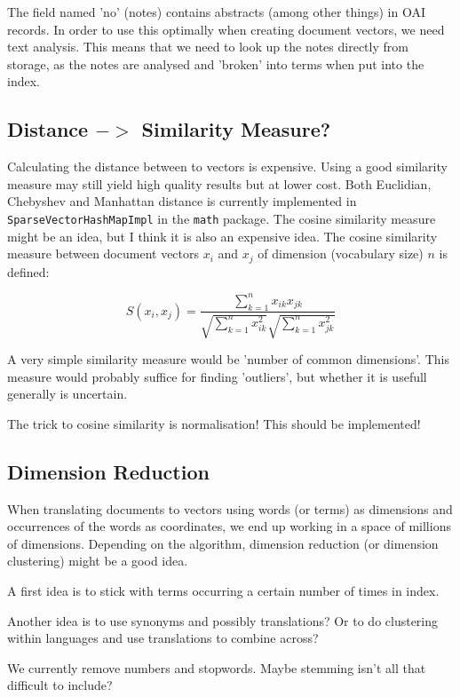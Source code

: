 \documentclass[a4paper,12pt]{article}
\begin{document}
The field named 'no' (notes) contains abstracts (among other things)
in OAI records. In order to use this optimally when creating document
vectors, we need text analysis. This means that we need to look up
the notes directly from storage, as the notes are analysed and
'broken' into terms when put into the index.

\subsection{Distance $->$ Similarity Measure?}

Calculating the distance between to vectors is expensive. Using a good
similarity measure may still yield high quality results but at lower
cost. Both Euclidian, Chebyshev and Manhattan distance is currently
implemented in \texttt{SparseVectorHashMapImpl} in the \texttt{math}
package. The cosine similarity measure might be an idea, but I think
it is also an expensive idea. The cosine similarity measure between
document vectors $x_i$ and $x_j$ of dimension (vocabulary size) $n$ is
defined:

\[S(x_i, x_j) = \frac{\sum_{k=1}^{n} x_{ik} x_{jk}}
{\sqrt{\sum_{k=1}^{n} x_{ik}^2}\sqrt{\sum_{k=1}^{n} x_{jk}^2}}\]

A very simple similarity measure would be 'number of common
dimensions'. This measure would probably suffice for finding
'outliers', but whether it is usefull generally is uncertain.

The trick to cosine similarity is normalisation! This should be
implemented!

\subsection{Dimension Reduction}

When translating documents to vectors using words (or terms) as
dimensions and occurrences of the words as coordinates, we end up
working in a space of millions of dimensions. Depending on the
algorithm, dimension reduction (or dimension clustering) might be a
good idea.

A first idea is to stick with terms occurring a certain number of
times in index.

Another idea is to use synonyms and possibly translations? Or to do
clustering within languages and use translations to combine across?

We currently remove numbers and stopwords. Maybe stemming isn't all
that difficult to include?
\end{document}
